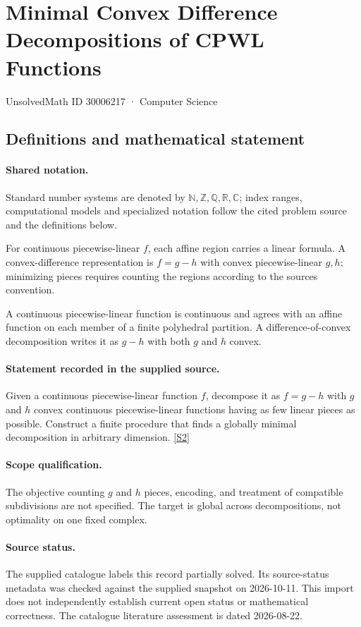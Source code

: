 \documentclass[11pt]{article}
\newcommand{\sref}[2]{\hyperlink{source:#1:#2}{[S#2]}}
\begin{document}
\setcounter{section}{30006216}
\section{Minimal Convex Difference Decompositions of CPWL Functions}\label{30006217}
{\small\sffamily UnsolvedMath ID 30006217 · Computer Science}
\subsection{Definitions and mathematical statement}

\paragraph{Shared notation.}Standard number systems are denoted by $\mathbb N,\mathbb Z,\mathbb Q,\mathbb R,\mathbb C$; index ranges, computational models and specialized notation follow the cited problem source and the definitions below.


For continuous piecewise-linear $f$, each affine region carries a linear formula. A convex-difference representation is $f=g-h$ with convex piecewise-linear $g,h$; minimizing pieces requires counting the regions according to the source\textquotesingle s convention.

A continuous piecewise-linear function is continuous and agrees with an affine function on each member of a finite polyhedral partition. A difference-of-convex decomposition writes it as $g-h$ with both $g$ and $h$ convex.
\paragraph{Statement recorded in the supplied source.}
Given a continuous piecewise-linear function $f$, decompose it as $f=g-h$ with $g$ and $h$ convex continuous piecewise-linear functions having as few linear pieces as possible. Construct a finite procedure that finds a globally minimal decomposition in arbitrary dimension. \sref{30006217}{2}
\paragraph{Scope qualification.}
The objective counting $g$ and $h$ pieces, encoding, and treatment of compatible subdivisions are not specified. The target is global across decompositions, not optimality on one fixed complex.
\paragraph{Source status.}
The supplied catalogue labels this record partially solved. Its source-status metadata was checked against the supplied snapshot on 2026-10-11. This import does not independently establish current open status or mathematical correctness. The catalogue literature assessment is dated 2026-08-22.
\end{document}
